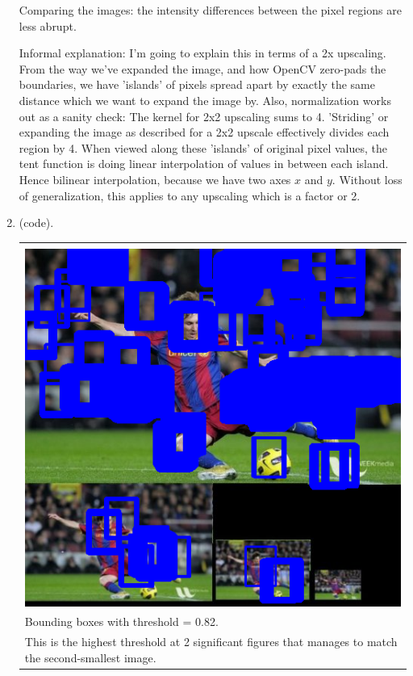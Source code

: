 \documentclass{article}
\begin{document}
\begin{enumerate}[label=(\roman*)]
Comparing the images: the intensity differences between the pixel regions are less abrupt.

Informal explanation: I'm going to explain this in terms of a 2x upscaling. From the way we've expanded the image, and how OpenCV zero-pads the boundaries, we have 'islands' of pixels spread apart by exactly the same distance which we want to expand the image by. Also, normalization works out as a sanity check: The kernel for 2x2 upscaling sums to 4. 'Striding' or expanding the image as described for a 2x2 upscale effectively divides each region by 4. When viewed along these 'islands' of original pixel values, the tent function is doing linear interpolation of values in between each island. Hence bilinear interpolation, because we have two axes $x$ and $y$. Without loss of generalization, this applies to any upscaling which is a factor or 2.

\item %
(code).

\begin{tabular}[t]{l}
	\hline \\
	\includegraphics[width=1.0\textwidth]{img/image_detections.png} \\
	Bounding boxes with threshold = 0.82. \\
	This is the highest threshold at 2 significant figures that manages to match the second-smallest image. \\
	\hline
\end{tabular}


\end{enumerate}
\end{document}
